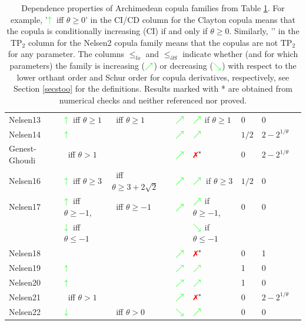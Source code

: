 \documentclass{article}
\newcommand{\cmark}{\color{green}{\ding{51}}\color{black}}%
\newcommand{\xmark}{\color{red}{\ding{55}}\color{black}}%
\newcommand{\gnearrow}{\color{green}{\nearrow}\color{black}}%
\newcommand{\gsearrow}{\color{green}{\searrow}\color{black}}%
\newcommand{\gdownarrow}{\color{green}{\downarrow}\color{black}}%
\newcommand{\guparrow}{\color{green}{\uparrow}\color{black}}%
\newcommand{\TP}{\mathrm{TP_2}}
\begin{document}
\begin{table}[t!]
\begin{center}
{\begin{tabular}{llllllll}
            Nelsen13 & $\guparrow$~iff $\theta \geq 1$ & \cmark~iff $\theta \geq 1$ & $\gnearrow$ & $\gnearrow$ if $\theta\geq 1$ &0 & 0 \\
            Nelsen14 & $\guparrow$& \cmark~ & $\gnearrow$ & $\gnearrow$ & $1/2$ & $2 - 2^{1/\theta}$ \\
            Genest-Ghoudi & \xmark~iff $\theta>1$& \xmark~& $\gnearrow$ &  $\text{\xmark}^*$ &0 & $2 - 2^{1/\theta}$ \\
            Nelsen16 & $\guparrow$~iff $\theta\geq 3$ & \cmark~iff $\theta\geq 3+2\sqrt{2}$ & $\gnearrow$ & $\gnearrow$~if $\theta \geq 3$& $1/2$ & 0 \\
            Nelsen17 & $\guparrow$~iff $\theta \geq -1$, & \cmark~iff $\theta \geq -1$ & $\gnearrow$ & $\gnearrow$ if $\theta\geq -1$, & 0& 0\\
            & $\gdownarrow$~iff $\theta\leq -1$ & & & $\gsearrow$ if $\theta\leq -1$ & &  \\
            Nelsen18 & \xmark~& \xmark~ & $\gnearrow$ & $\text{\xmark}^*$ & 0&1 \\
            Nelsen19 & $\guparrow$ & \cmark~& $\gnearrow$ & $\gnearrow$ & 1 & 0 \\
            Nelsen20 & $\guparrow$ & \cmark~ & $\gnearrow$ & $\gnearrow$ & 1 & 0 \\
            Nelsen21 & \xmark~iff $\theta>1$& \xmark~& $\gnearrow$ &  $\text{\xmark}^*$ &0 & $2 - 2^{1/\theta}$ \\
            Nelsen22 & $\gdownarrow$ & \xmark~iff $\theta > 0$ & $\gsearrow$ & $\gnearrow$ & 0&0 \\
            \bottomrule
        \end{tabular}
        }
    \end{center}
    \caption{
        Dependence properties of Archimedean copula families from Table \ref{tab:arch_results}.
        For example, '$\guparrow$~iff $\theta\geq 0$' in the CI/CD column for the Clayton copula means that the copula is conditionally increasing (CI) if and only if $\theta\geq 0$.
        Similarly, '\xmark' in the \(\TP\) column for the Nelsen2 copula family means that the copulas are not \(\TP\) for any parameter.
        The columns \(\leq_{lo}\) and \(\leq_{\partial S}\) indicate whether (and for which parameters) the family is increasing (\(\gnearrow\)) or decreasing (\(\gsearrow\)) with respect to the lower orthant order and Schur order for copula derivatives, respectively, see Section \ref{secstoo} for the definitions.
        Results marked with * are obtained from numerical checks and neither referenced nor proved.
    }
    \label{tab:arch_results}
\end{table}
\end{document}
